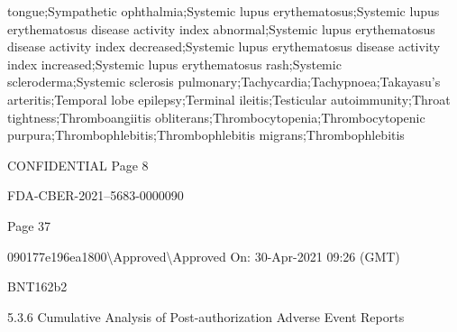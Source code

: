 \begin{refsection}
\begin{tcolorbox}[quote]
tongue;Sympathetic ophthalmia;Systemic lupus erythematosus;Systemic lupus erythematosus disease activity index abnormal;Systemic lupus erythematosus disease activity index decreased;Systemic lupus erythematosus disease activity index increased;Systemic lupus erythematosus rash;Systemic scleroderma;Systemic sclerosis pulmonary;Tachycardia;Tachypnoea;Takayasu's arteritis;Temporal lobe epilepsy;Terminal ileitis;Testicular autoimmunity;Throat tightness;Thromboangiitis obliterans;Thrombocytopenia;Thrombocytopenic purpura;Thrombophlebitis;Thrombophlebitis migrans;Thrombophlebitis

CONFIDENTIAL Page 8

FDA-CBER-2021--5683-0000090

Page 37

090177e196ea1800\textbackslash{}Approved\textbackslash{}Approved On: 30-Apr-2021 09:26 (GMT)

BNT162b2

5.3.6 Cumulative Analysis of Post-authorization Adverse Event Reports


\end{tcolorbox}
\end{refsection}
